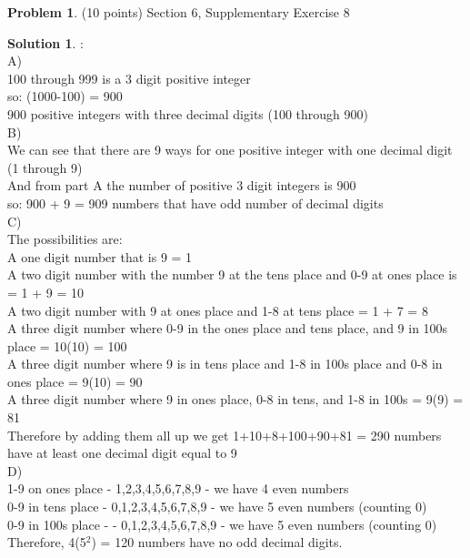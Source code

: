 \documentclass{article}
\theoremstyle{definition}
\newtheorem{problem}{Problem}
\newtheorem*{solution}{Solution}
\begin{document}
\begin{problem} (10 points) Section 6, Supplementary Exercise 8
\end{problem}
\begin{solution}:
\\
   A) 
\\
100 through 999 is a 3 digit positive integer
\\
so: (1000-100) = 900
\\
900 positive integers with three decimal digits (100 through 900)
\\

B) 
\\We can see that there are 9 ways for one positive integer with one decimal digit (1 through 9)
\\
And from part A the number of positive 3 digit integers is 900
\\
so: 900 + 9 = 909 numbers that have odd number of decimal digits
\\

C)\\
The possibilities are:
\\
 A one digit number that is 9 = 1 
 \\
 A two digit number with the number 9 at the tens place and 0-9 at ones place is = 1 + 9 = 10
 \\
 A two digit number with 9 at ones place and 1-8 at tens place = 1 + 7 = 8
 \\
 A three digit number where 0-9 in the ones place and tens place, and 9 in 100s place = 10(10) = 100
 \\
 A three digit number where 9 is in tens place and 1-8 in 100s place and 0-8 in ones place = 9(10) = 90
 \\
 A three digit number where 9 in ones place, 0-8 in tens, and 1-8 in 100s = 9(9) = 81
 \\
 Therefore by adding them all up we get 1+10+8+100+90+81 = 290 numbers have at least one decimal digit equal to 9
\\

D) 
\\
1-9 on ones place - 1,2,3,4,5,6,7,8,9 - we have 4 even numbers
\\
0-9 in tens place - 0,1,2,3,4,5,6,7,8,9 - we have 5 even numbers (counting 0)
\\
0-9 in 100s place - - 0,1,2,3,4,5,6,7,8,9 - we have 5 even numbers (counting 0)
\\
Therefore, 4(5$^2$) = 120 numbers have no odd decimal digits.
\\


\end{solution}
\end{document}
